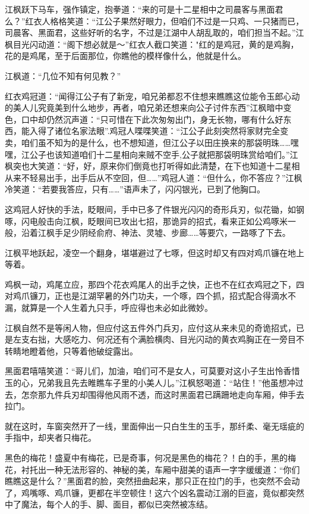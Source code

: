 \documentclass[12pt,oneside]{book}
\begin{document}
江枫跃下马车，强作镇定，抱拳道：``来的可是十二星相中之司晨客与黑面君么？''红衣人格格笑道：``江公子果然好眼力，但咱们不过是一只鸡、一只猪而已，司晨客、黑面君，这些好听的名字，不过是江湖中人胡乱取的，咱们担当不起。''江枫目光闪动道：``阁下想必就是～''红衣人截口笑道："红的是鸡冠，黄的是鸡胸，花的是鸡尾，至于后面那位，你瞧他的模样像什么，他就是什么。

江枫道：``几位不知有何见教？''

红衣鸡冠道：``闻得江公子有了新宠，咱兄弟都忍不住想来瞧瞧这位能令玉郎心动的美人儿究竟美到什么地步，再者，咱兄弟还想来向公子讨件东西''江枫暗中变色，口中却仍然沉声道：``只可惜在下此次匆匆出门，身无长物，哪有什么好东西，能入得了诸位名家法眼''.鸡冠人喋喋笑道：``江公子此刻突然将家财完全变卖，咱们虽不知为的是什么，也不想知道，但江公子以田庄换来的那袋明珠\ldots\ldots 嘿嘿，江公子也该知道咱们十二星相向来贼不空手,公子就把那袋明珠赏给咱们。''江枫突也大笑道：``好，好，原来你们倒竟也打听得如此清楚，在下也知道十二星相从来不轻易出手，出手后从不空回，但\ldots\ldots{}''鸡冠人道：``但什么，你不答应？''江枫冷笑道：``若要我答应，只有\ldots\ldots{}''语声未了，闪闪银光，已到了他胸口。

这鸡冠人好快的手法，眨眼间，手中已多了件银光闪闪的奇形兵刃，似花锄，如钢啄，闪电般击向江枫，眨眼间已攻出七招，那诡异的招式，看来正如公鸡啄米一般，沿着江枫手足少阴经俞府、神法、灵墟、步廊\ldots\ldots 等要穴，一路啄了下去。

江枫平地跃起，凌空一个翻身，堪堪避过了七啄，但这时却又有四对鸡爪镰在地上等着。

鸡枫一动，鸡尾立应，那四个花衣鸡尾人的出手之快，正也不在红衣鸡冠之下，四对鸡爪镰刀，正也是江湖罕暑的外门功夫，一个啄，四个抓，招式配合得滴水不漏，就算是一个人生着九只手，呼应得也未必如此微妙。

江枫自然不是等闲人物，但应付这五件外门兵刃，应付这从来未见的奇诡招式，已是左支右拙，大感吃力、何况还有个满脸横肉、目光闪动的黄衣鸡胸正在一旁目不转睛地瞪着他，只等着他破绽露出。

黑面君嘻嘻笑道：``哥儿们，加油，咱们可不是女人，可莫要对这小子生出怜香惜玉的心，兄弟我且先去睢瞧车子里的小美人儿。''江枫怒喝道：``站住！''他虽想冲过去，怎奈那九件兵刃却围得他风雨不透，而这时黑面君已蹒跚地走向车厢，伸手去拉门。

就在这时，车窗突然开了一线，里面伸出一只白生生的玉手，那纤柔、毫无瑶疵的手指中，却夹者只梅花。

黑色的梅花！盛夏中有梅花，已是奇事，何况是黑色的梅花？！白的手，黑的梅花，衬托出一种无法形容的、神秘的美，车厢中甜美的语声一字字缓缓道：``你们瞧瞧这是什么？''黑面君的脸，突然扭曲起来，那只正在拉门的手，也突然不会动了，鸡嘴啄、鸡爪镰，更都在半空顿住！这六个凶名震动江溺的巨盗，竟似都突然中了魔法，每个人的手、脚、面目，都似已突然被冻结。
\end{document}
